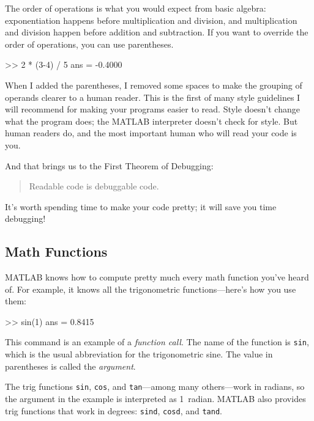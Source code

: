 The order of operations is what you would expect from basic algebra:
exponentiation happens before multiplication and division, and multiplication and division happen before addition and subtraction.
If you want to override the order of operations, you can use parentheses.


\begin{code}
>> 2 * (3-4) / 5
ans = -0.4000
\end{code}

When I added the parentheses, I removed some spaces to make the
grouping of operands clearer to a human reader.  This is the first
of many style guidelines I will recommend for making your programs
easier to read.  Style doesn't change what the program does; the MATLAB
interpreter doesn't check for style.  But human readers do, and the
most important human who will read your code is you.


And that brings us to the First Theorem of Debugging:

\begin{quote}
Readable code is debuggable code.
\end{quote}

It's worth spending time to make your code pretty; it will save
you time \mbox{debugging}!


\subsection{Math Functions}

MATLAB knows how to compute pretty much every math function you've
heard of. For example, it knows all the trigonometric functions---here's how you
use them:


\begin{code}
>> sin(1)
ans = 0.8415
\end{code}

This command is an example of a \emph{function call}.  The name of the
function is \lstinline{sin}, which is the usual abbreviation for the
trigonometric sine.  The value in parentheses is called the \emph{argument}.
%
%

The trig functions \lstinline{sin}, \lstinline{cos}, and  \lstinline{tan}---among many
others---work in radians, so the argument in the example is interpreted as 1~radian.
MATLAB also provides trig functions that work in degrees: \lstinline{sind}, \lstinline{cosd}, and \lstinline{tand}.

